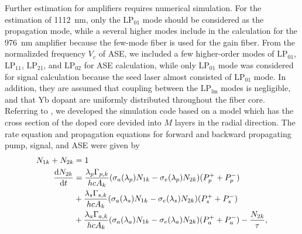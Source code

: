 \documentclass{osa-article}
\begin{document}
Further estimation for amplifiers requires numerical simulation.
For the estimation of \SI{1112}{\nm}, only the $\mathrm{LP_{01}}$ mode should be considered as the propagation mode, while a several higher modes include in the calculation for the \SI{976}{\nm} amplifier because the few-mode fiber is used for the gain fiber.
From the normalizded frequency $V_{c}$ of ASE, we included a few higher-order modes of $\mathrm{LP_{01}}$, $\mathrm{LP_{11}}$, $\mathrm{LP_{21}}$, and $\mathrm{LP_{02}}$ for ASE calculation, while only $\mathrm{LP_{01}}$ mode was considered for signal calculation because the seed laser almost consisted of $\mathrm{LP_{01}}$ mode.
In addition, they are assumed that coupling between the $\mathrm{LP_{lm}}$ modes is negligible, and that Yb dopant are uniformly distributed throughout the fiber core.
Referring to \cite{gong2007numerical}, we developed the simulation code based on a model which has the cross section of the doped core devided into $M$ layers in the radial direction.
The rate equation and propagation equations for forward and backward propagating pump, signal, and ASE were given by
\begin{equation}
  \begin{split}
    N_{1k} + N_{2k} &= 1\\
    \dv{N_{2k}}{t} &= \frac{\lambda_{p} \Gamma_{p, k}}{hcA_{k}} (\sigma_{a}(\lambda_{p})N_{1k} - \sigma_{e}(\lambda_{p})N_{2k}) (P^{+}_{p} + P^{-}_{p})\\
    &+ \frac{\lambda_{s} \Gamma_{s, k}}{hcA_{k}} (\sigma_{a}(\lambda_{s})N_{1k} - \sigma_{e}(\lambda_{s})N_{2k}) (P^{+}_{s} + P^{-}_{s})\\
    &+ \frac{\lambda_{a} \Gamma_{a, k}}{hcA_{k}} (\sigma_{a}(\lambda_{a})N_{1k} - \sigma_{e}(\lambda_{a})N_{2k}) (P^{+}_{a} + P^{-}_{a}) - \frac{N_{2k}}{\tau},
  \end{split}
  \label{eq:RateEquation}
\end{equation}
\end{document}
